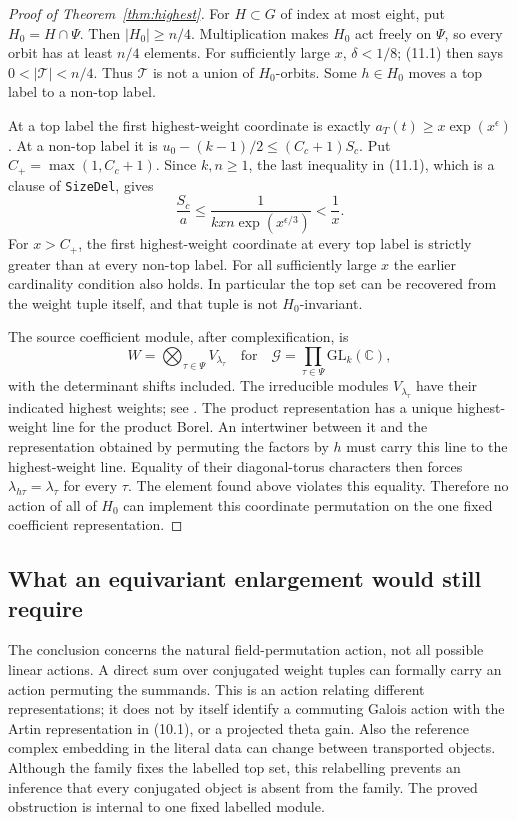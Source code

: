 \begin{proof}[Proof of Theorem~\ref{thm:highest}]
For $H\subset G$ of index at most eight, put $H_0=H\cap\Psi$.
Then $|H_0|\ge n/4$. Multiplication makes $H_0$ act freely
on $\Psi$, so every orbit has at least $n/4$ elements.
For sufficiently large $x$, $\delta<1/8$; (11.1) then says
$0<|\mathcal T|<n/4$. Thus $\mathcal T$ is not a union of
$H_0$-orbits. Some $h\in H_0$ moves a top label to a non-top label.

At a top label the first highest-weight coordinate is exactly
$a_T(t)\ge x\exp(x^\epsilon)$. At a non-top label it is
$u_0-(k-1)/2\le(C_c+1)S_c$. Put
$C_+=\max(1,C_c+1)$. Since $k,n\ge1$, the last inequality
in (11.1), which is a clause of \texttt{SizeDel}, gives
\[
 \frac{S_c}{a}\le\frac1{kxn\exp(x^{\epsilon/3})}<\frac1x.
                                                        \tag{11.3}
\]
For $x>C_+$, the first highest-weight coordinate at every top
label is strictly greater than at every non-top label. For all
sufficiently large $x$ the earlier cardinality condition also holds.
In particular the top set can be recovered from the
weight tuple itself, and that tuple is not $H_0$-invariant.

The source coefficient module, after complexification, is
\[
       W=\bigotimes_{\tau\in\Psi}V_{\lambda_\tau}
       \quad\text{for}\quad
       \mathcal G=\prod_{\tau\in\Psi}\mathrm{GL}_k(\mathbb C),
                                                        \tag{11.4}
\]
with the determinant shifts included. The irreducible modules
$V_{\lambda_\tau}$ have their indicated highest weights;
see \citet[Sections~20.3--20.8]{Milne2018}. The product
representation has a unique highest-weight line for the product
Borel. An intertwiner between it and the representation obtained
by permuting the factors by $h$ must carry this line to the
highest-weight line. Equality of their diagonal-torus characters
then forces $\lambda_{h\tau}=\lambda_\tau$ for every $\tau$.
The element found above violates this equality. Therefore no
action of all of $H_0$ can implement this coordinate permutation
on the one fixed coefficient representation.
\end{proof}

\subsection{What an equivariant enlargement would still require}

The conclusion concerns the natural field-permutation action,
not all possible linear actions. A direct sum over conjugated
weight tuples can formally carry an action permuting the
summands. This is an action relating different representations;
it does not by itself identify a commuting Galois action with
the Artin representation in (10.1), or a projected theta gain.
Also the reference complex embedding in the literal data can
change between transported objects. Although the family fixes
the labelled top set, this relabelling prevents an inference
that every conjugated object is absent from the family. The
proved obstruction is internal to one fixed labelled module.

